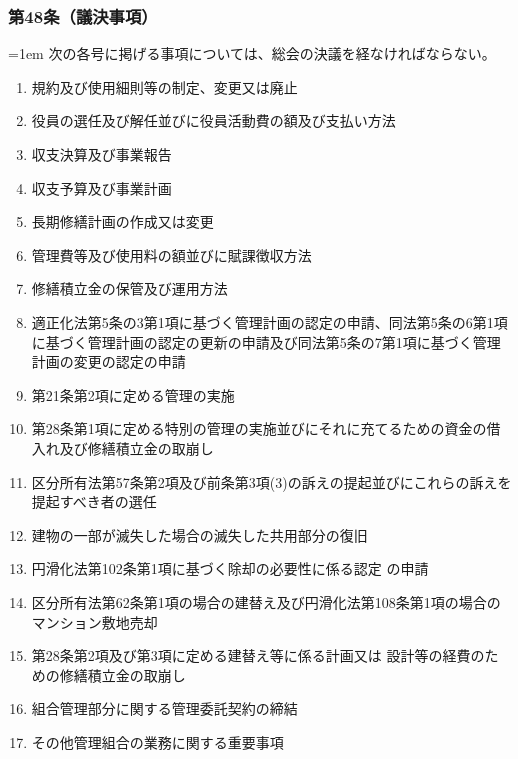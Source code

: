 \documentclass[
  luatex,
  paper=a4paper,
  fontsize=11pt,
  jafontsize=11pt,
  jlreq_notes,
]{jlreq}
\newcommand{\joumain}[1]{%
  \noindent\hangindent=1em\hangafter=1
  \hspace{1em}#1%
}
\begin{document}
  \subsubsection*{第48条（議決事項）}
  \joumain{次の各号に掲げる事項については、総会の決議を経なければならない。}
  \begin{enumerate}
    \item 規約及び使用細則等の制定、変更又は廃止
    \item 役員の選任及び解任並びに役員活動費の額及び支払い方法
    \item 収支決算及び事業報告
    \item 収支予算及び事業計画
    \item 長期修繕計画の作成又は変更
    \item 管理費等及び使用料の額並びに賦課徴収方法
    \item 修繕積立金の保管及び運用方法
    \item 適正化法第5条の3第1項に基づく管理計画の認定の申請、同法第5条の6第1項に基づく管理計画の認定の更新の申請及び同法第5条の7第1項に基づく管理計画の変更の認定の申請
    \item 第21条第2項に定める管理の実施
    \item 第28条第1項に定める特別の管理の実施並びにそれに充てるための資金の借入れ及び修繕積立金の取崩し
    \item 区分所有法第57条第2項及び前条第3項(3)の訴えの提起並びにこれらの訴えを提起すべき者の選任
    \item 建物の一部が滅失した場合の滅失した共用部分の復旧
    \item 円滑化法第102条第1項に基づく除却の必要性に係る認定 の申請
    \item 区分所有法第62条第1項の場合の建替え及び円滑化法第108条第1項の場合のマンション敷地売却
    \item 第28条第2項及び第3項に定める建替え等に係る計画又は 設計等の経費のための修繕積立金の取崩し
    \item 組合管理部分に関する管理委託契約の締結
    \item その他管理組合の業務に関する重要事項
  \end{enumerate}
\end{document}
